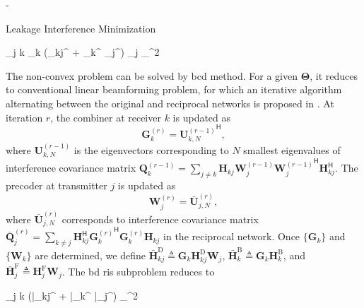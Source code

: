 \documentclass[journal]{IEEEtran}
\begin{document}
\begin{section}{-}
	\begin{subsection}{Leakage Interference Minimization}
		\begin{mini!}
			{}{\mathop{\sum\sum}_{j \neq k} \left\lVert {}_k (_{kj}^ + _k^ \mathbf{\Theta} _j^) _j \right\rVert _{}^2}{}{}
		\end{mini!}
		The non-convex problem can be solved by \gls{bcd} method.
		For a given $\mathbf{\Theta}$, it reduces to conventional linear beamforming problem, for which an iterative algorithm alternating between the original and reciprocal networks is proposed in \cite{Gomadam2011,Clerckx2013}.
		At iteration $r$, the combiner at receiver $k$ is updated as
		\begin{equation}
			\mathbf{G}_k^{(r)} = {\mathbf{U}_{k,N}^{(r-1)}}^\mathsf{H},
		\end{equation}
		where $\mathbf{U}_{k,N}^{(r-1)}$ is the eigenvectors corresponding to $N$ smallest eigenvalues of interference covariance matrix $\mathbf{Q}_k^{(r-1)} = \sum_{j \ne k} \mathbf{H}_{kj} \mathbf{W}_j^{(r-1)} {\mathbf{W}_j^{(r-1)}}^\mathsf{H} \mathbf{H}_{kj}^\mathsf{H}$.
		The precoder at transmitter $j$ is updated as
		\begin{equation}
			\mathbf{W}_j^{(r)} = \bar{\mathbf{U}}_{j,N}^{(r)},
		\end{equation}
		where $\bar{\mathbf{U}}_{j,N}^{(r)}$ corresponds to interference covariance matrix $\bar{\mathbf{Q}}_j^{(r)} = \sum_{k \ne j} \mathbf{H}_{kj}^\mathsf{H} {\mathbf{G}_k^{(r)}}^\mathsf{H} \mathbf{G}_k^{(r)} \mathbf{H}_{kj}$ in the reciprocal network.
		Once $\{\mathbf{G}_k\}$ and $\{\mathbf{W}_k\}$ are determined, we define $\bar{\mathbf{H}}_{kj}^\mathrm{D} \triangleq \mathbf{G}_k \mathbf{H}_{kj}^\mathrm{D} \mathbf{W}_j$, $\bar{\mathbf{H}}_k^\mathrm{B} \triangleq \mathbf{G}_k \mathbf{H}_k^\mathrm{B}$, and $\bar{\mathbf{H}}_j^\mathrm{F} \triangleq \mathbf{H}_j^\mathrm{F} \mathbf{W}_j$.
		The \gls{bd} \gls{ris} subproblem reduces to
		\begin{mini!}
			{\scriptstyle{\mathbf{\Theta}}}{\mathop{\sum\sum}_{j \neq k} \left\lVert (\bar{}_{kj}^ + \bar{}_k^ \mathbf{\Theta} \bar{}_j^) \right\rVert _{}^2}{\label{op:ic_interference_ris}}{}
			\addConstraint{\mathbf{\Theta}_g^\mathsf{H} \mathbf{\Theta}_g=\mathbf{I}, \quad \forall g.}{}{}
		\end{mini!}


\end{subsection}
\end{section}
\end{document}
